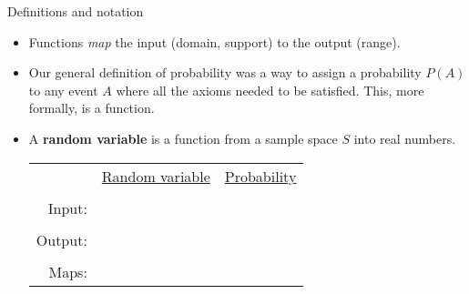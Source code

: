 \documentclass{article}
\begin{document}
Definitions and notation\bigskip
\begin{itemize}
    \item Functions \textit{map} the input (domain, support) to the output (range).\bigskip
    \item Our general definition of probability was a way to assign a probability $P(A)$ to any event $A$ where all the axioms needed to be satisfied. This, more formally, is a function.    
    \item A \textbf{random variable} is a function from a sample space $S$ into real numbers.\vspace{90pt}\\
    \begin{tabular}{rll}
         & \ul{Random variable} \hspace{100pt} & \ul{Probability} \\\\
         Input: & &\\\\
         Output: & &\\\\
         Maps: & &
     \end{tabular}


\end{itemize}
\end{document}
